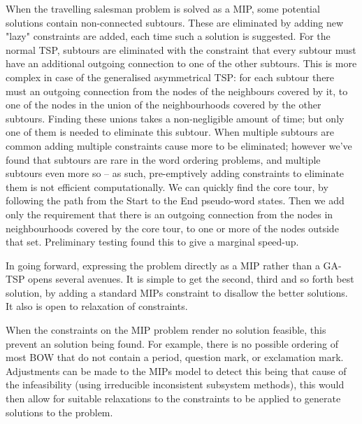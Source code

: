 \documentclass[11pt]{article}
\theoremstyle{plain}
\theoremstyle{definition}
\begin{document}
When the travelling salesman problem is solved as a MIP,  some potential solutions contain non-connected subtours. These are eliminated by adding new "lazy" constraints are added, each time such a solution is suggested. For the normal TSP, subtours are eliminated with the constraint that every subtour must have an additional outgoing connection to one of the other subtours. This is more complex in case of the generalised asymmetrical TSP: for each subtour there must an outgoing connection from the nodes of the neighbours covered by it, to one of the nodes in the union of the neighbourhoods covered by the other subtours. Finding these unions takes a non-negligible amount of time; but only one of them is needed to eliminate this subtour. When multiple subtours are common adding multiple constraints cause more to be eliminated; however we've found that subtours are rare in the word ordering problems, and multiple subtours even more so -- as such, pre-emptively adding constraints to eliminate them is not efficient computationally. We can quickly find the core tour, by following the path from the Start to the End pseudo-word states. Then we add only the requirement that there is an outgoing connection from the nodes in neighbourhoods covered by the core tour, to one or more of the nodes outside that set. Preliminary testing found this to give a marginal speed-up.

In going forward, expressing the problem directly as a MIP rather than a GA-TSP opens several avenues. It is simple to get the second, third and so forth best solution, by adding a standard MIPs constraint to disallow the better solutions. It also is open to relaxation of constraints. 

When the constraints on the MIP problem render no solution feasible, this prevent an solution being found. For example, there is no possible ordering of most BOW that do not contain a period, question mark, or exclamation mark. Adjustments can be made to the MIPs model to detect this being that cause of the infeasibility (using irreducible inconsistent subsystem methods), this would then allow for suitable relaxations to the constraints to be applied to generate solutions to the problem.
\end{document}
